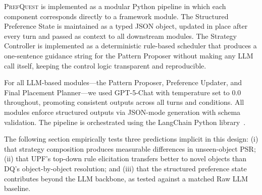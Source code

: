 \documentclass[manuscript,review,anonymous]{acmart}
\newcommand{\revend}{\color{black}}       %
\renewcommand{\revend}{}
\begin{document}
{\textsc{PrefQuest} is implemented as a modular Python pipeline in which each component corresponds directly to a framework module. The Structured Preference State is maintained as a typed JSON object, updated in place after every turn and passed as context to all downstream modules. The Strategy Controller is implemented as a deterministic rule-based scheduler that produces a one-sentence guidance string for the Pattern Proposer without making any LLM call itself, keeping the control logic transparent and reproducible.

For all LLM-based modules---the Pattern Proposer, Preference Updater, and Final Placement Planner---we used GPT-5-Chat with temperature set to 0.0 throughout, promoting consistent outputs across all turns and conditions. All modules enforce structured outputs via JSON-mode generation with schema validation. The pipeline is orchestrated using the LangChain Python library~\cite{langchain2023}.

The following section empirically tests three predictions implicit in this design: (i) that strategy composition produces measurable differences in unseen-object PSR; (ii) that UPF's top-down rule elicitation transfers better to novel objects than DQ's object-by-object resolution; and (iii) that the structured preference state contributes beyond the LLM backbone, as tested against a matched Raw LLM baseline.

\revend}

\end{document}
